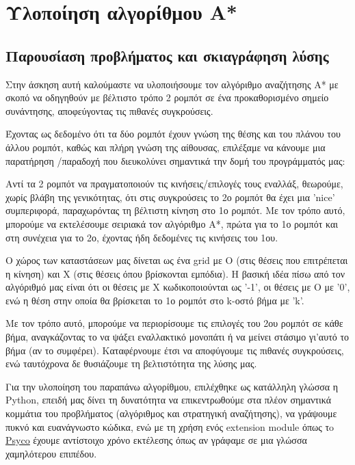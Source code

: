\documentclass[a4paper,9pt]{article}
\begin{document}


\section*{Υλοποίηση αλγορίθμου A*} \setcounter{section}{1}
\subsection{Παρουσίαση προβλήματος και σκιαγράφηση λύσης}
Στην άσκηση αυτή καλούμαστε να υλοποιήσουμε τον αλγόριθμο αναζήτησης Α* με
σκοπό να οδηγηθούν με βέλτιστο τρόπο 2 ρομπότ σε ένα προκαθορισμένο σημείο
συνάντησης, αποφεύγοντας τις πιθανές συγκρούσεις.

Έχοντας ως δεδομένο ότι τα δύο ρομπότ έχουν γνώση της θέσης και του
πλάνου του άλλου ρομπότ, καθώς και πλήρη γνώση της αίθουσας, επιλέξαμε να
κάνουμε μια παρατήρηση /παραδοχή που διευκολύνει σημαντικά την δομή του
προγράμματός μας:

Αντί τα 2 ρομπότ να πραγματοποιούν τις κινήσεις/επιλογές τους εναλλάξ,
θεωρούμε, χωρίς βλάβη της γενικότητας, ότι στις συγκρούσεις το 2ο ρομπότ θα
έχει μια 'nice' συμπεριφορά, παραχωρόντας τη βέλτιστη κίνηση στο 1ο ρομπότ. Με
τον τρόπο αυτό, μπορούμε να εκτελέσουμε σειριακά τον αλγόριθμο A*, πρώτα για
το 1ο ρομπότ και στη συνέχεια για το 2ο, έχοντας ήδη δεδομένες τις κινήσεις
του 1ου.

Ο χώρος των καταστάσεων μας δίνεται ως ένα grid με Ο (στις θέσεις που
επιτρέπεται η κίνηση) και Χ (στις θέσεις όπου βρίσκονται εμπόδια). Η βασική
ιδέα πίσω από τον αλγόριθμό μας είναι ότι οι θέσεις με Χ κωδικοποιούνται ως
'-1', οι θέσεις με O με '0', ενώ η θέση στην οποία θα βρίσκεται το 1ο ρομπότ
στο k-οστό βήμα με 'k'.

Με τον τρόπο αυτό, μπορούμε να περιορίσουμε τις επιλογές του 2ου ρομπότ σε
κάθε βήμα, αναγκάζοντας το να ψάξει εναλλακτικό μονοπάτι ή να μείνει στάσιμο
γι'αυτό το βήμα (αν το συμφέρει). Καταφέρνουμε έτσι να αποφύγουμε τις πιθανές
συγκρούσεις, ενώ ταυτόχρονα δε θυσιάζουμε τη βελτιστότητα της λύσης μας.

Για την υλοποίηση του παραπάνω αλγορίθμου, επιλέχθηκε ως κατάλληλη γλώσσα η
Python, επειδή μας δίνει τη δυνατότητα να επικεντρωθούμε στα πλέον σημαντικά
κομμάτια του προβλήματος (αλγόριθμος και στρατηγική αναζήτησης), να γράψουμε
πυκνό και ευανάγνωστο κώδικα, ενώ με τη χρήση ενός extension module όπως
τo \underline{\href{http://psyco.sourceforge.net/}{Psyco}} έχουμε αντίστοιχο χρόνο
εκτέλεσης όπως αν γράφαμε σε μια γλώσσα χαμηλότερου επιπέδου.
\end{document}
